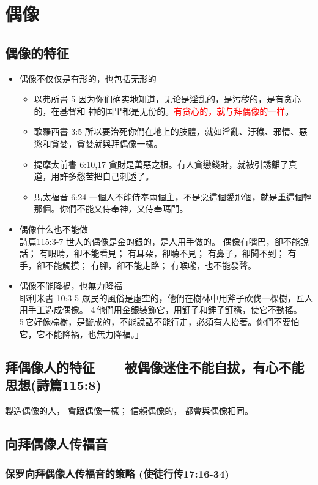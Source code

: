 \chapter{偶像}
\section{偶像的特征}

\begin{itemize}
\item 偶像不仅仅是有形的，也包括无形的\\
\begin{itemize}
\item 以弗所書 5 因为你们确实地知道，无论是淫乱的，是污秽的，是有贪心的，在基督和 神的国里都是无份的。\textcolor{red}{有贪心的，就与拜偶像的一样}。
\item 歌羅西書 3:5 所以要治死你們在地上的肢體，就如淫亂、汙穢、邪情、惡慾和貪婪，貪婪就與拜偶像一樣。
\item 提摩太前書 6:10,17 貪財是萬惡之根。有人貪戀錢財，就被引誘離了真道，用許多愁苦把自己刺透了。
\item 馬太福音 6:24 一個人不能侍奉兩個主，不是惡這個愛那個，就是重這個輕那個。你們不能又侍奉神，又侍奉瑪門。
\end{itemize}
\item 偶像什么也不能做\\
詩篇115:3-7 世人的偶像是金的銀的，是人用手做的。
偶像有嘴巴，卻不能說話；
有眼睛，卻不能看見；
有耳朵，卻聽不見；
有鼻子，卻聞不到；
有手，卻不能觸摸；
有腳，卻不能走路；
有喉嚨，也不能發聲。
\item 偶像不能降禍，也無力降福\\
耶利米書 10:3-5 眾民的風俗是虛空的，他們在樹林中用斧子砍伐一棵樹，匠人用手工造成偶像。 4 他們用金銀裝飾它，用釘子和錘子釘穩，使它不動搖。 5 它好像棕樹，是鏇成的，不能說話不能行走，必須有人抬著。你們不要怕它，它不能降禍，也無力降福。」
\end{itemize}

\section{拜偶像人的特征——被偶像迷住不能自拔，有心不能思想(詩篇115:8)}
製造偶像的人，
會跟偶像一樣；
信賴偶像的，
都會與偶像相同。


\section{向拜偶像人传福音}
\subsection{保罗向拜偶像人传福音的策略 (使徒行传17:16-34)}


